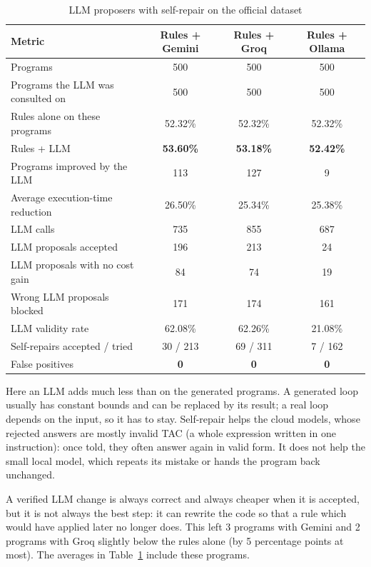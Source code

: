 \documentclass[12pt,a4paper]{report}
\begin{document}
\begin{table}[H]
\centering
\caption{LLM proposers with self-repair on the official dataset}
\label{tab:realllms}
\small
\begin{tabular}{|l|c|c|c|}
\hline
\textbf{Metric} & \textbf{Rules + Gemini} & \textbf{Rules + Groq} & \textbf{Rules + Ollama} \\
\hline
Programs & 500 & 500 & 500 \\
\hline
Programs the LLM was consulted on & 500 & 500 & 500 \\
\hline
Rules alone on these programs & 52.32\% & 52.32\% & 52.32\% \\
\hline
Rules + LLM & \textbf{53.60\%} & \textbf{53.18\%} & \textbf{52.42\%} \\
\hline
Programs improved by the LLM & 113 & 127 & 9 \\
\hline
Average execution-time reduction & 26.50\% & 25.34\% & 25.38\% \\
\hline
LLM calls & 735 & 855 & 687 \\
\hline
LLM proposals accepted & 196 & 213 & 24 \\
\hline
LLM proposals with no cost gain & 84 & 74 & 19 \\
\hline
Wrong LLM proposals blocked & 171 & 174 & 161 \\
\hline
LLM validity rate & 62.08\% & 62.26\% & 21.08\% \\
\hline
Self-repairs accepted / tried & 30 / 213 & 69 / 311 & 7 / 162 \\
\hline
False positives & \textbf{0} & \textbf{0} & \textbf{0} \\
\hline
\end{tabular}
\end{table}

Here an LLM adds much less than on the generated programs. A generated loop usually has constant bounds and can be replaced by its result; a real loop depends on the input, so it has to stay. Self-repair helps the cloud models, whose rejected answers are mostly invalid TAC (a whole expression written in one instruction): once told, they often answer again in valid form. It does not help the small local model, which repeats its mistake or hands the program back unchanged.

A verified LLM change is always correct and always cheaper when it is accepted, but it is not always the best step: it can rewrite the code so that a rule which would have applied later no longer does. This left 3 programs with Gemini and 2 programs with Groq slightly below the rules alone (by 5 percentage points at most). The averages in Table~\ref{tab:realllms} include these programs.
\end{document}
